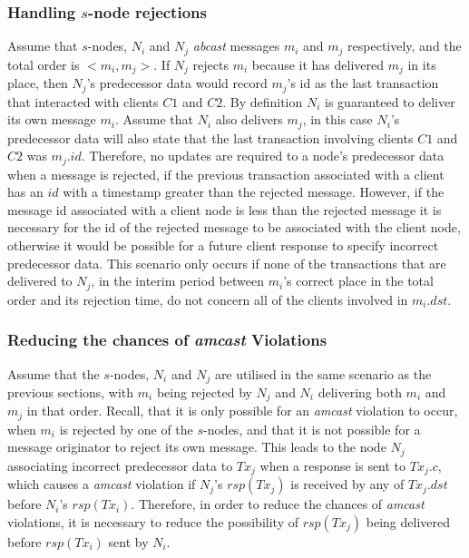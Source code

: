     \subsubsection*{Handling $s$-node rejections}
    Assume that $s$-nodes, $N_i$ and $N_j$ \emph{abcast} messages $m_i$ and $m_j$ respectively, and the total order is $<m_i, m_j>$.  If $N_j$ rejects $m_i$ because it has delivered $m_j$ in its place, then $N_j$'s predecessor data would record $m_j$'s id as the last transaction that interacted with clients $C1$ and $C2$.  By definition $N_i$ is guaranteed to deliver its own message $m_i$.  Assume that $N_i$ also delivers $m_j$, in this case $N_i$'s predecessor data will also state that the last transaction involving clients $C1$ and $C2$ was $m_j.id$.  Therefore, no updates are required to a node's predecessor data when a message is rejected, if the previous transaction associated with a client has an $id$ with a timestamp greater than the rejected message.  However, if the message id associated with a client node is less than the rejected message it is necessary for the id of the rejected message to be associated with the client node, otherwise it would be possible for a future client response to specify incorrect predecessor data.  This scenario only occurs if none of the transactions that are delivered to $N_j$, in the interim period between $m_i$'s correct place in the total order and its rejection time, do not concern all of the clients involved in $m_i.dst$.  
    
        
    \subsubsection*{Reducing the chances of \emph{amcast} Violations}
    Assume that the $s$-nodes, $N_i$ and $N_j$ are utilised in the same scenario as the previous sections, with $m_i$ being rejected by $N_j$ and $N_i$ delivering both $m_i$ and $m_j$ in that order.  Recall, that it is only possible for an \emph{amcast} violation to occur, when $m_i$ is rejected by one of the $s$-nodes, and that it is not possible for a message originator to reject its own message.  This leads to the node $N_j$ associating incorrect predecessor data to $Tx_j$ when a response is sent to $Tx_j.c$, which causes a \emph{amcast} violation if $N_j$'s $rsp(Tx_j)$ is received by any of $Tx_j.dst$ before $N_i$'s $rsp(Tx_i)$.  Therefore, in order to reduce the chances of \emph{amcast} violations, it is necessary to reduce the possibility of $rsp(Tx_j)$ being delivered before $rsp(Tx_i)$ sent by $N_i$.  
    
